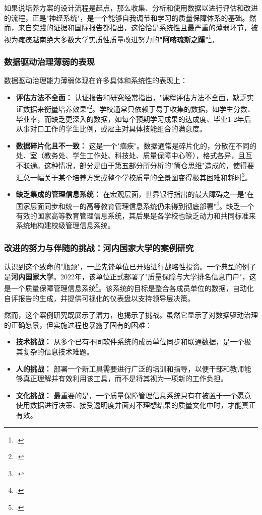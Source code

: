 如果说培养方案的设计流程是起点，那么收集、分析和使用数据以进行评估和改进的流程，正是"神经系统"，是一个能够自我调节和学习的质量保障体系的基础。然而，来自实践的证据和国际报告都指出，这恰恰是系统性且最严重的薄弱环节，被视为瘫痪越南绝大多数大学实质性质量改进努力的\textbf{"阿喀琉斯之踵"}\footcite{worldbank_improvingperformance_2020}。

\subsubsection{数据驱动治理薄弱的表现}
数据驱动治理能力薄弱体现在许多具体和系统性的表现上：
\begin{itemize}
    \item \textbf{评估方法不全面：} 认证报告和研究经常指出，"课程评估方法不全面，缺乏实证数据来衡量培养效果"\footcite{csph_iqa_2023}。学校通常只依赖于易于收集的数据，如学生分数、毕业率，而缺乏更深入的数据，如每个预期学习成果的达成度、毕业1-2年后从事对口工作的学生比例，或雇主对具体技能组合的满意度。
    
    \item \textbf{数据碎片化且不一致：} 这是一个"痼疾"。数据通常是碎片化的，分散在不同的处、室（教务处、学生工作处、科技处、质量保障中心等），格式各异，且互不联通。这种情况，部分是由于第五部分所分析的"筒仓思维"造成的，使得要汇总一幅关于某个培养方案或整个学校质量的全景图变得极其困难和耗时\footcite{aunsec_redesigningIQA_2022}。
    
    \item \textbf{缺乏集成的管理信息系统：} 在宏观层面，世界银行指出的最大障碍之一是"在国家层面同步和统一的高等教育管理信息系统仍未得到彻底部署"\footcite{worldbank_improvingperformance_2020}。缺乏一个有效的国家高等教育管理信息系统，其后果是各学校也缺乏动力和共同标准来系统地构建校级管理信息系统。
\end{itemize}

\subsubsection{改进的努力与伴随的挑战：河内国家大学的案例研究}
认识到这个致命的"瓶颈"，一些先锋单位已开始进行战略性投资。一个典型的例子是\textbf{河内国家大学}。2022年，该单位正式部署了"质量保障与大学排名信息门户"，这是一个质量保障管理信息系统\footcite{vnu_qamis_2022}。该系统的目标是整合各成员单位的数据，自动化自评报告的生成，并提供可视化的仪表盘以支持领导层决策。

然而，这个案例研究既展示了潜力，也揭示了挑战。虽然它显示了对数据驱动治理的正确愿景，但实施过程也暴露了固有的困难：
\begin{itemize}
    \item \textbf{技术挑战：} 从多个已有不同软件系统的成员单位同步和联通数据，是一个极其复杂的信息技术难题。
    \item \textbf{人的挑战：} 部署一个新工具需要进行广泛的培训和指导，以便干部和教师能够真正理解并有效利用该工具，而不是将其视为一项新的工作负担。
    \item \textbf{文化挑战：} 最重要的是，一个质量保障管理信息系统只有在被置于一个愿意使用数据进行决策、接受透明度并面对不理想结果的质量文化中时，才能真正有效。
\end{itemize}

